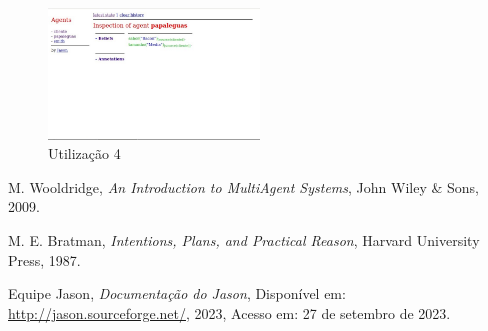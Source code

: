\documentclass[12pt]{article}
\begin{document}
    \begin{figure}[!ht]
        \centering
        \includegraphics[width=0.5\textwidth]{figures/imagem04.jpeg}
        \caption{Utilização 4}
        \label{fig:imagem5}
    \end{figure}
    
\begin{thebibliography}{9}
M. Wooldridge,
\textit{An Introduction to MultiAgent Systems},
John Wiley \& Sons, 2009.

M. E. Bratman,
\textit{Intentions, Plans, and Practical Reason},
Harvard University Press, 1987.

Equipe Jason,
\textit{Documentação do Jason},
Disponível em: \url{http://jason.sourceforge.net/}, 2023, Acesso em: 27 de setembro de 2023.

\end{thebibliography}
\end{document}
